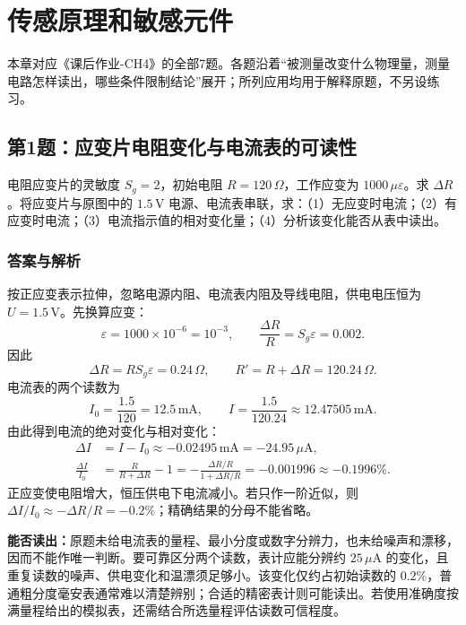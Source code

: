 \chapter{传感原理和敏感元件}
\label{chap:hw-sensors}

\noindent 本章对应《课后作业-CH4》的全部7题。各题沿着“被测量改变什么物理量，测量电路怎样读出，哪些条件限制结论”展开；所列应用均用于解释原题，不另设练习。

\section{第1题：应变片电阻变化与电流表的可读性}
\label{sec:hw-sensors-1}
\label{hw:4-1}
\begin{hwquestion}
电阻应变片的灵敏度 $S_g=2$，初始电阻 $R=120\,\Omega$，工作应变为 $1000\,\mu\varepsilon$。求 $\Delta R$。将应变片与原图中的 $1.5\,\mathrm V$ 电源、电流表串联，求：（1）无应变时电流；（2）有应变时电流；（3）电流指示值的相对变化量；（4）分析该变化能否从表中读出。
\end{hwquestion}

\subsection*{答案与解析}
按正应变表示拉伸，忽略电源内阻、电流表内阻及导线电阻，供电电压恒为 $U=1.5\,\mathrm V$。先换算应变：
\[
\varepsilon=1000\times10^{-6}=10^{-3},\qquad
\frac{\Delta R}{R}=S_g\varepsilon=0.002.
\]
因此
\[
\boxed{\Delta R=RS_g\varepsilon=0.24\,\Omega},\qquad
R'=R+\Delta R=120.24\,\Omega.
\]
电流表的两个读数为
\[
\boxed{I_0=\frac{1.5}{120}=12.5\,\mathrm{mA}},\qquad
\boxed{I=\frac{1.5}{120.24}\approx12.47505\,\mathrm{mA}}.
\]
由此得到电流的绝对变化与相对变化：
\begin{align*}
\Delta I&=I-I_0\approx-0.02495\,\mathrm{mA}=-24.95\,\mu\mathrm A,\\
\boxed{\frac{\Delta I}{I_0}}
&=\frac{R}{R+\Delta R}-1
=-\frac{\Delta R/R}{1+\Delta R/R}
=\boxed{-0.001996\approx-0.1996\%}.
\end{align*}
正应变使电阻增大，恒压供电下电流减小。若只作一阶近似，则 $\Delta I/I_0\approx-\Delta R/R=-0.2\%$；精确结果的分母不能省略。

\textbf{能否读出：}原题未给电流表的量程、最小分度或数字分辨力，也未给噪声和漂移，因而不能作唯一判断。要可靠区分两个读数，表计应能分辨约 $25\,\mu\mathrm A$ 的变化，且重复读数的噪声、供电变化和温漂须足够小。该变化仅约占初始读数的 $0.2\%$，普通粗分度毫安表通常难以清楚辨别；合适的精密表计则可能读出。若使用准确度按满量程给出的模拟表，还需结合所选量程评估读数可信程度。

